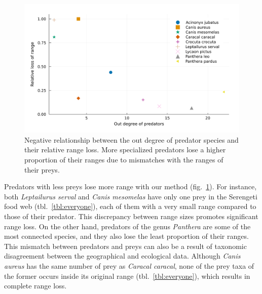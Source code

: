 \documentclass[10pt,oneside]{article}
\makeatletter
\def\maxwidth{\ifdim\Gin@nat@width>\linewidth\linewidth
\else\Gin@nat@width\fi}
\let\Oldincludegraphics\includegraphics
\renewcommand{\includegraphics}[1]{\Oldincludegraphics[width=\maxwidth]{#1}}
\makeatother
\begin{document}
\begin{figure}
\hypertarget{fig:degree}{%
\centering
\includegraphics{figures/rel_loss-outdegree-species.png}
\caption{Negative relationship between the out degree of predator
species and their relative range loss. More specialized predators lose a
higher proportion of their ranges due to mismatches with the ranges of
their preys.}\label{fig:degree}
}
\end{figure}

Predators with less preys lose more range with our method
(fig.~\ref{fig:degree}). For instance, both \emph{Leptailurus serval}
and \emph{Canis mesomelas} have only one prey in the Serengeti food web
(tbl.~\ref{tbl:everyone}), each of them with a very small range compared
to those of their predator. This discrepancy between range sizes
promotes significant range loss. On the other hand, predators of the
genus \emph{Panthera} are some of the most connected species, and they
also lose the least proportion of their ranges. This mismatch between
predators and preys can also be a result of taxonomic disagreement
between the geographical and ecological data. Although \emph{Canis
aureus} has the same number of prey as \emph{Caracal caracal}, none of
the prey taxa of the former occurs inside its original range
(tbl.~\ref{tbl:everyone}), which results in complete range loss.
\end{document}
